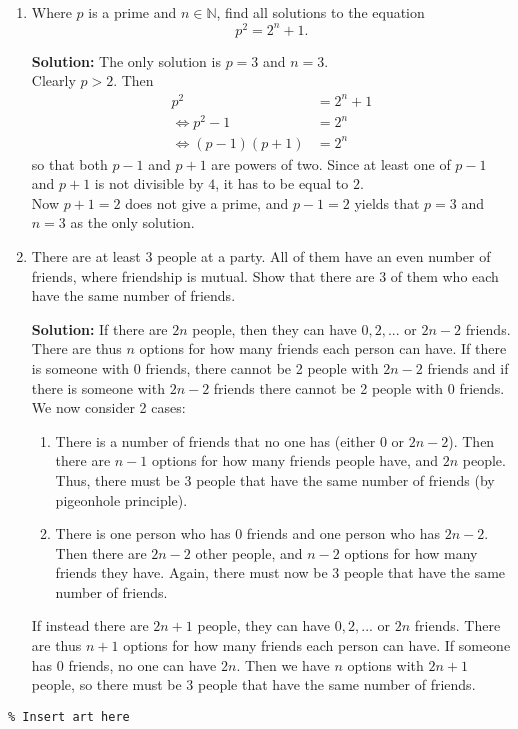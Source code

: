 \documentclass{article}
\begin{document}
\begin{enumerate}[itemsep=\fill]
\item %
Where $p$ is a prime and $n\in\mathbb{N}$, find all solutions to the equation \[p^2 = 2^n + 1.\]

\textbf{Solution:} The only solution is $p = 3$ and $n = 3$.
\\ Clearly $p>2$. Then 
\begin{align*}
	p^2 &= 2^n + 1
	\\ \iff p^2-1 &= 2^n
	\\ \iff (p-1)(p+1) &= 2^n
\end{align*}
so that both $p-1$ and $p+1$ are powers of two. Since at least one of $p-1$ and $p+1$ is not divisible by $4$, it has to be equal to $2$.
\\ Now $p+1 = 2$ does not give a prime, and $p-1 = 2$ yields that $p =3$ and $n=3$ as the only solution. 

\item
There are at least 3 people at a party. All of them have an even number of friends, where friendship is mutual. Show that there are 3 of them who each have the same number of friends.

\textbf{Solution:} If there are $2n$ people, then they can have $0,2,...$ or $2n-2$ friends. There are thus $n$ options for how many friends each person can have. If there is someone with 0 friends, there cannot be 2 people with $2n-2$ friends and if there is someone with $2n-2$ friends there cannot be 2 people with 0 friends. We now consider 2 cases:
\begin{enumerate}
\item There is a number of friends that no one has (either 0 or $2n-2$). Then there are $n-1$ options for how many friends people have, and $2n$ people. Thus, there must be 3 people that have the same number of friends (by pigeonhole principle).
\item There is one person who has 0 friends and one person who has $2n-2$. Then there are $2n-2$ other people, and $n-2$ options for how many friends they have. Again, there must now be 3 people that have the same number of friends.
\end{enumerate}
If instead there are $2n+1$ people, they can have $0,2,...$ or $2n$ friends. There are thus $n+1$ options for how many friends each person can have. If someone has 0 friends, no one can have $2n$. Then we have $n$ options with $2n+1$ people, so there must be 3 people that have the same number of friends.




\end{enumerate}


\centering
\small
\begin{BVerbatim}
\end{BVerbatim}
\end{document}
